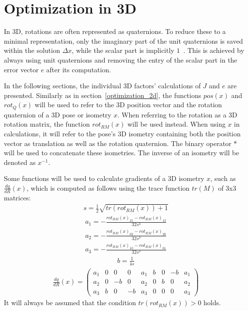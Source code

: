 \section{Optimization in 3D}
\label{optimization_3d}
In 3D, rotations are often represented as quaternions. To reduce these to a minimal representation, only the imaginary part of the unit quaternions is saved within the solution $\Delta x$, while the scalar part is implicitly $1$~\cite{grisetti2010tutorial}. This is achieved by always using unit quaternions and removing the entry of the scalar part in the error vector $e$ after its computation.

In the following sections, the individual 3D factors' calculations of $J$ and $e$ are presented. Similarly as in section~\ref{optimization_2d}, the functions $pos(x)$ and $rot_Q(x)$ will be used to refer to the 3D position vector and the rotation quaternion of a 3D pose or isometry $x$. When referring to the rotation as a 3D rotation matrix, the function $rot_{RM}(x)$ will be used instead. When using $x$ in calculations, it will refer to the pose's 3D isometry containing both the position vector as translation as well as the rotation quaternion. The binary operator $*$ will be used to concatenate these isometries. The inverse of an isometry will be denoted as $x^{-1}$.

Some functions will be used to calculate gradients of a 3D isometry $x$, such as $\frac{dq}{dR}(x)$, which is computed as follows using the trace function $tr(M)$ of 3x3 matrices:
\begin{align}
	s = \frac{1}{2}\sqrt{tr(rot_{RM}(x)) + 1}
\end{align}
\begin{align}
	a_1 = -\frac{rot_{RM}(x)_{21}-rot_{RM}(x)_{12}}{32s^3}
\end{align}
\begin{align}
	a_2 = -\frac{rot_{RM}(x)_{02}-rot_{RM}(x)_{20}}{32s^3}
\end{align}
\begin{align}
	a_3 = -\frac{rot_{RM}(x)_{10}-rot_{RM}(x)_{01}}{32s^3}
\end{align}
\begin{align}
	b = \frac{1}{4s}
\end{align}
\begin{align}
	\frac{dq}{dR}(x) =
	\begin{pmatrix}
		a_1 & 0 &  0 &  0 & a_1 & b & 0 & -b & a_1\\
		a_2 & 0 & -b &  0 & a_2 & 0 & b &  0 & a_2\\
		a_3 & b &  0 & -b & a_3 & 0 & 0 &  0 & a_3
	\end{pmatrix}
\end{align}
It will always be assumed that the condition $tr(rot_{RM}(x)) > 0$ holds.

